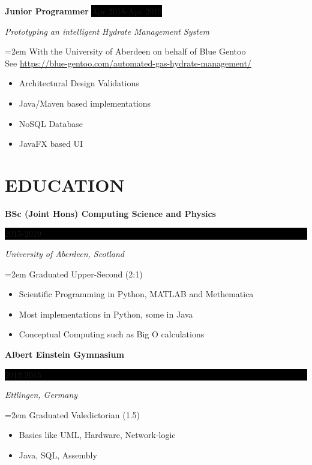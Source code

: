 \documentclass[paper=a4,fontsize=11pt]{scrartcl} %
\newcommand{\sepspace}{\vspace*{1em}}    %
\newcommand{\NewPart}[1]{\section*{\uppercase{{#1}}}}
\newcommand{\EducationEntry}[4]{
  \noindent \textbf{#1} \hfill      %
    \colorbox{Black}{%
      \parbox{6em}{%
      \hfill\color{White}#2}} \par  %
      \noindent \textit{#3} \par        %
      \noindent\hangindent=2em\hangafter=0 \small #4 %
    \normalsize \par}
\newcommand{\WorkEntry}[4]{          %
  \noindent \textbf{#1} \hfill      %
  \colorbox{Black}{\color{White}#2} \par  %
  \noindent \textit{#3} \par              %
  \noindent\hangindent=2em\hangafter=0 \small #4 %
  \normalsize \par}
\begin{document}
\sepspace

\WorkEntry{Junior Programmer}{Apr 2018-Apr 2019}{Prototyping an intelligent
Hydrate Management System}{With the University of Aberdeen on behalf of Blue
Gentoo \\
\hspace{5pt} \footnotesize See
\textcolor{headerColor}{\url{https://blue-gentoo.com/automated-gas-hydrate-management/}}
\vspace{5pt}
\begin{itemize}[noitemsep,topsep=0pt]
  \item Architectural Design Validations
  \item Java/Maven based implementations
  \item NoSQL Database
  \item JavaFX based UI
\end{itemize}
}


\cleardoublepage

  \StylisedName
  \SameAddress

\NewPart{Education}{}

\EducationEntry{BSc (Joint Hons) Computing Science and
Physics}{2015-2019}{University of Aberdeen, Scotland}{
Graduated Upper-Second (2:1)
\vspace{5pt}
\begin{itemize}[noitemsep,topsep=0pt]
  \item Scientific Programming in Python, MATLAB and Methematica
  \item Most implementations in Python, some in Java
  \item Conceptual Computing such as Big O calculations
\end{itemize}
}

\sepspace

\EducationEntry{Albert Einstein Gymnasium}{2012-2015}{Ettlingen,
Germany}{Graduated Valedictorian (1.5)
\vspace{5pt}
\begin{itemize}[noitemsep,topsep=0pt]
  \item Basics like UML, Hardware, Network-logic
  \item Java, SQL, Assembly
\end{itemize}
}
\end{document}
